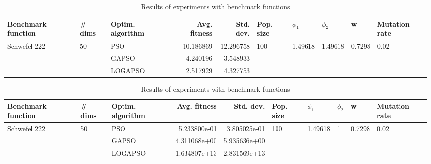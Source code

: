 \documentclass{article}
\begin{document}
\begin{table}
\centering
\caption{Results of experiments with benchmark functions}
\begin{tabular}{lllrrlllll}
\toprule
           Benchmark function &             \# dims & Optim. algorithm &  Avg. fitness &  Std. dev. &            Pop. size &               $\phi_{1}$ &               $\phi_{2}$ &                       w &         Mutation rate \\
\midrule
\multirow{3}{*}{Schwefel 222} & \multirow{3}{*}{50} &              PSO &     10.186869 &  12.296758 & \multirow{3}{*}{100} & \multirow{3}{*}{1.49618} & \multirow{3}{*}{1.49618} & \multirow{3}{*}{0.7298} & \multirow{3}{*}{0.02} \\
                              &                     &            GAPSO &      4.240196 &   3.548933 &                      &                          &                          &                         &                       \\
                              &                     &          LOGAPSO &      2.517929 &   4.327753 &                      &                          &                          &                         &                       \\
\bottomrule
\end{tabular}
\end{table}
\begin{table}
\centering
\caption{Results of experiments with benchmark functions}
\begin{tabular}{lllrrlllll}
\toprule
           Benchmark function &             \# dims & Optim. algorithm &  Avg. fitness &    Std. dev. &            Pop. size &               $\phi_{1}$ &         $\phi_{2}$ &                       w &         Mutation rate \\
\midrule
\multirow{3}{*}{Schwefel 222} & \multirow{3}{*}{50} &              PSO &  5.233800e-01 & 3.805025e-01 & \multirow{3}{*}{100} & \multirow{3}{*}{1.49618} & \multirow{3}{*}{1} & \multirow{3}{*}{0.7298} & \multirow{3}{*}{0.02} \\
                              &                     &            GAPSO &  4.311068e+00 & 5.935636e+00 &                      &                          &                    &                         &                       \\
                              &                     &          LOGAPSO &  1.634807e+13 & 2.831569e+13 &                      &                          &                    &                         &                       \\
\bottomrule
\end{tabular}
\end{table}
\end{document}
